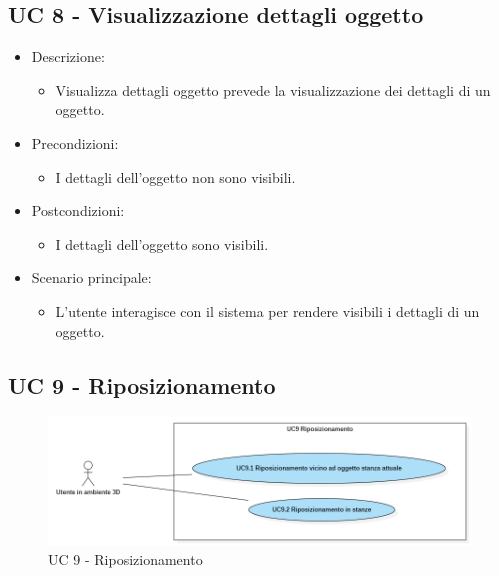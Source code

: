 \subsection{UC 8 - Visualizzazione dettagli oggetto}
\begin{itemize}

	\item Descrizione:
	\begin{itemize}
		\item Visualizza dettagli oggetto prevede la visualizzazione dei dettagli di un oggetto.
	\end{itemize}
	
	\item Precondizioni:
	\begin{itemize}
		\item I dettagli dell'oggetto non sono visibili.
	\end{itemize}
	
	\item Postcondizioni:
	\begin{itemize}
		\item I dettagli dell'oggetto sono visibili.
	\end{itemize}
	
	\item Scenario principale:
	\begin{itemize}
		\item L'utente interagisce con il sistema per rendere visibili i dettagli di un oggetto.
	\end{itemize}
	
\end{itemize}

\subsection{UC 9 - Riposizionamento}

\begin{figure}[H]
  \renewcommand{\thefigure}{8}
  \includegraphics[width=\linewidth]{./res/images/UC9.png}
  \caption{UC 9 - Riposizionamento}
  \label{fig:UC 9}
\end{figure}


